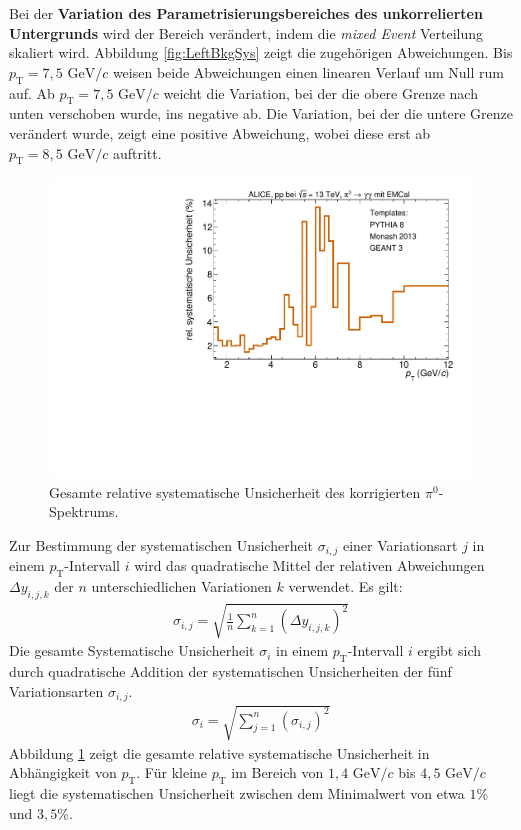 \newline
Bei der \textbf{Variation des Parametrisierungsbereiches des unkorrelierten Untergrunds} wird der Bereich verändert, indem die \textit{mixed Event} Verteilung skaliert wird.
Abbildung \ref{fig:LeftBkgSys} zeigt die zugehörigen Abweichungen.
Bis $p_\text{T} = 7,5 \text{ GeV}/c$ weisen beide Abweichungen einen linearen Verlauf um Null rum auf.
Ab $p_\text{T} = 7,5 \text{ GeV}/c$ weicht die Variation, bei der die obere Grenze nach unten verschoben wurde, ins negative ab.
Die Variation, bei der die untere Grenze verändert wurde, zeigt eine positive Abweichung, wobei diese erst ab $p_\text{T} = 8,5 \text{ GeV}/c$ auftritt.
\begin{figure}[t!]
\centering
\includegraphics[width=.65\linewidth]{SystematischeUnsicherheit_Data_2016.pdf}
\caption{Gesamte relative systematische Unsicherheit des korrigierten $\pi^ {0}$-Spektrums.}
\label{fig:SysUncer}
\end{figure}
\newline
Zur Bestimmung der systematischen Unsicherheit $\sigma_{i,j}$ einer Variationsart $j$ in einem $p_\text{T}$-Intervall $i$ wird das quadratische Mittel der relativen Abweichungen $\Delta y_{i,j,k}$ der $n$ unterschiedlichen Variationen $k$ verwendet.
Es gilt:
\begin{align}
\sigma_{i,j} = \sqrt{\frac{1}{n}\sum_{k=1}^{n}\left(\Delta y_{i,j,k}\right)^{2}}
\end{align}
Die gesamte Systematische Unsicherheit $\sigma_{i}$ in einem $p_\text{T}$-Intervall $i$ ergibt sich durch quadratische Addition der systematischen Unsicherheiten der fünf Variationsarten $\sigma_{i,j}$.
\begin{align}
\sigma_{i} = \sqrt{\sum_{j=1}^{n}\left(\sigma_{i,j}\right)^{2}}
\end{align}
Abbildung \ref{fig:SysUncer} zeigt die gesamte relative systematische Unsicherheit in Abhängigkeit von $p_\text{T}$.
Für kleine $p_\text{T}$ im Bereich von $1,4 \text{ GeV}/c$ bis $4,5 \text{ GeV}/c$ liegt die systematischen Unsicherheit zwischen dem Minimalwert von etwa $1\%$ und $3,5\%$.

